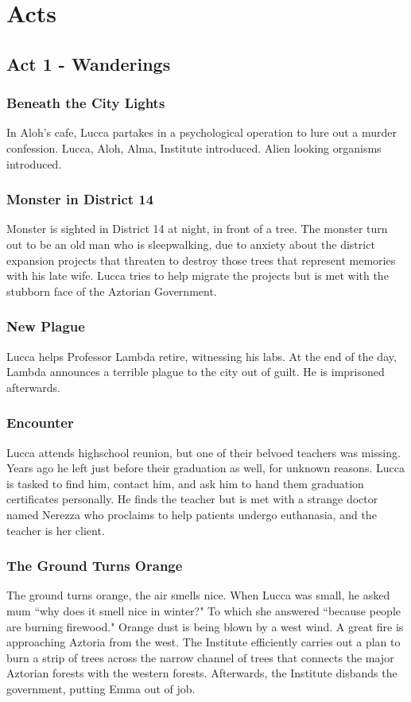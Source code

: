 \documentclass[11pt]{article}
\begin{document}
\newpage






\section{Acts}
	\subsection{Act 1 - Wanderings}
		\subsubsection{Beneath the City Lights}
		In Aloh's cafe, Lucca partakes in a psychological operation to lure out a murder confession.
		Lucca, Aloh, Alma, Institute introduced.
		Alien looking organisms introduced. 
		\subsubsection{Monster in District 14}
		Monster is sighted in District 14 at night, in front of a tree.
		The monster turn out to be an old man who is sleepwalking, due to anxiety about the district expansion projects that threaten to destroy those trees that represent memories with his late wife.
		Lucca tries to help migrate the projects but is met with the stubborn face of the Aztorian Government.
		\subsubsection{New Plague}
		Lucca helps Professor Lambda retire, witnessing his labs.
		At the end of the day, Lambda announces a terrible plague to the city out of guilt. 
		He is imprisoned afterwards.
		\subsubsection{Encounter}
		Lucca attends highschool reunion, but one of their belvoed teachers was missing.
		Years ago he left just before their graduation as well, for unknown reasons.
		Lucca is tasked to find him, contact him, and ask him to hand them graduation certificates personally.
		He finds the teacher but is met with a strange doctor named Nerezza who proclaims to help patients undergo euthanasia, and the teacher is her client.
		\subsubsection{The Ground Turns Orange}
		The ground turns orange, the air smells nice.
		When Lucca was small, he asked mum ``why does it smell nice in winter?"
		To which she answered ``because people are burning firewood."
		Orange dust is being blown by a west wind.
		A great fire is approaching Aztoria from the west. 
		The Institute efficiently carries out a plan to burn a strip of trees across the narrow channel of trees that connects the major Aztorian forests with the western forests.
		Afterwards, the Institute disbands the government, putting Emma out of job.
\end{document}
